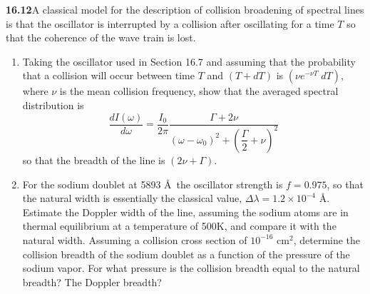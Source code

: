 \par\bigskip
\noindent\textbf{16.12}\quad A classical model for the description of collision broadening of spectral lines is that the oscillator is interrupted by a collision after oscillating for a time $T$ so that the coherence of the wave train is lost.
\begin{enumerate}
\item[(a)] Taking the oscillator used in Section 16.7 and assuming that the probability that a collision will occur between time $T$ and $(T+dT)$ is $(\nu e^{-\nu T}\;dT)$, where $\nu$ is the mean collision frequency, show that the averaged spectral distribution is
\[
\frac{dI(\omega)}{d\omega}=\frac{I_{0}}{2\pi}\frac{\Gamma+2\nu}{(\omega-\omega_{0})^{2}+\left(\dfrac{\Gamma}{2}+\nu\right)^{2}}
\]
so that the breadth of the line is $(2\nu+\Gamma)$.
\item[(b)] For the sodium doublet at 5893 \AA\ the oscillator strength is $f=0.975$, so that the natural width is essentially the classical value, $\Delta\lambda=1.2\times10^{-4}$ \AA. Estimate the Doppler width of the line, assuming the sodium atoms are in thermal equilibrium at a temperature of 500K, and compare it with the natural width. Assuming a collision cross section of $10^{-16}$ cm$^{2}$, determine the collision breadth of the sodium doublet as a function of the pressure of the sodium vapor. For what pressure is the collision breadth equal to the natural breadth? The Doppler breadth?
\end{enumerate}
\solution

